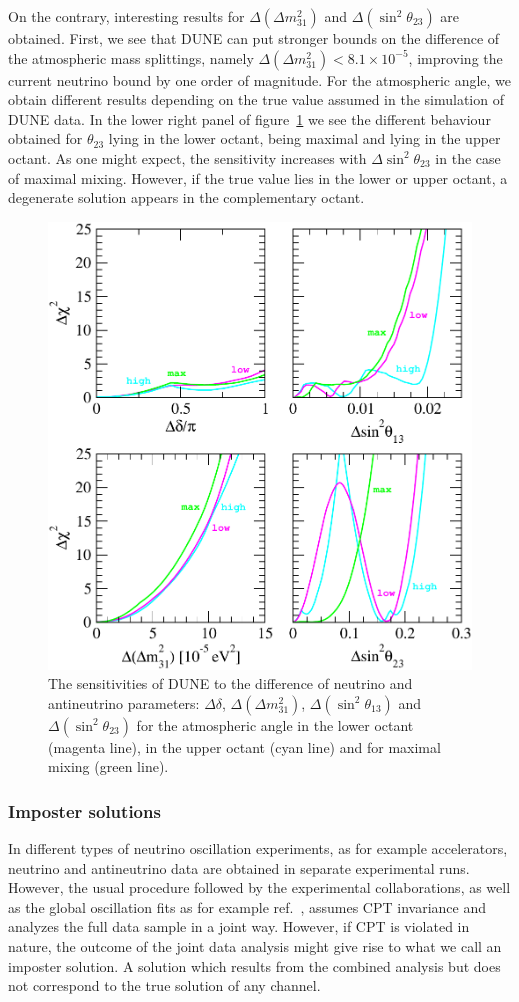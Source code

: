 On the contrary, interesting results for $\Delta(\Delta m_{31}^2)$ and $\Delta(\sin^2\theta_{23})$ are obtained. First, we see that  DUNE can put stronger bounds on the difference of the atmospheric mass splittings, namely $\Delta(\Delta m_{31}^2) < 8.1\times 10^{-5}$, improving the current neutrino bound by one order of magnitude. For the atmospheric angle, we obtain different results depending on the true value assumed in the simulation of DUNE data. In the lower right panel of figure~\ref{fig:sensitivity-CPT} we see the different behaviour obtained for $\theta_{23}$ lying in the lower octant, being maximal and lying in the upper octant. As one might expect, the sensitivity increases with $\Delta\sin^2\theta_{23}$ in the case of maximal mixing. However, if the true value lies in the lower or upper octant, a degenerate solution appears in the complementary octant.
\begin{figure}[!htb]
 \centering
        \includegraphics[width=0.55\columnwidth]{graphics/sensitivity-CPT.pdf}
        \caption{The sensitivities of DUNE to the difference of neutrino and antineutrino parameters: 
        $\Delta\delta$, $\Delta(\Delta m_{31}^2)$, $\Delta(\sin^2\theta_{13})$ and $\Delta(\sin^2\theta_{23})$  
        for the atmospheric angle in the lower octant (magenta line),  in the upper octant (cyan line) and for maximal mixing (green line).}
	\label{fig:sensitivity-CPT}
\end{figure}

\subsubsection{Imposter solutions}
\label{sec:impost}
In different types of neutrino oscillation experiments, as for example accelerators, neutrino and antineutrino data are obtained in separate experimental runs. However, the usual procedure followed by the experimental collaborations, as well as the global oscillation fits as for example ref.~\cite{deSalas:2017kay}, assumes CPT invariance and analyzes the full data sample in a joint way. 
%
However, if CPT is violated in nature, the outcome of the joint data analysis might give rise to what we call an imposter solution. A solution which results from the combined analysis but does not correspond to the true solution of any channel. 


